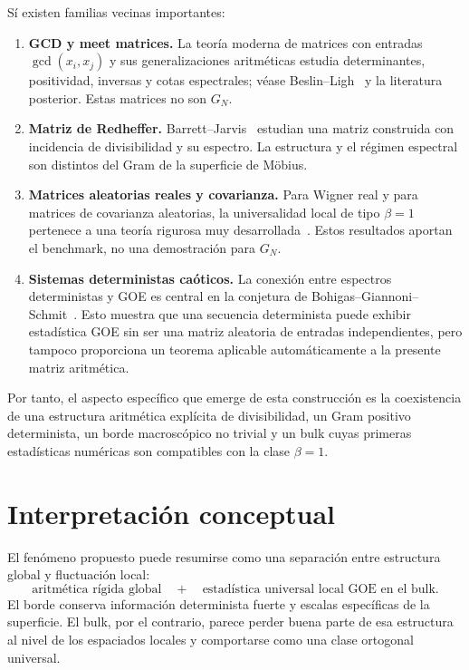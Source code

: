\documentclass[11pt,a4paper]{article}
\begin{document}
Sí existen familias vecinas importantes:

\begin{enumerate}
\item \textbf{GCD y meet matrices.} La teoría moderna de matrices con entradas $\gcd(x_i,x_j)$ y sus generalizaciones aritméticas estudia determinantes, positividad, inversas y cotas espectrales; véase Beslin--Ligh~\cite{BeslinLigh1989} y la literatura posterior. Estas matrices no son $G_N$.

\item \textbf{Matriz de Redheffer.} Barrett--Jarvis~\cite{BarrettJarvis1992} estudian una matriz construida con incidencia de divisibilidad y su espectro. La estructura y el régimen espectral son distintos del Gram de la superficie de Möbius.

\item \textbf{Matrices aleatorias reales y covarianza.} Para Wigner real y para matrices de covarianza aleatorias, la universalidad local de tipo $\beta=1$ pertenece a una teoría rigurosa muy desarrollada~\cite{ErdosYau2012,ErdosYauYin2012,TaoVuCov2012}. Estos resultados aportan el benchmark, no una demostración para $G_N$.

\item \textbf{Sistemas deterministas caóticos.} La conexión entre espectros deterministas y GOE es central en la conjetura de Bohigas--Giannoni--Schmit~\cite{BGS1984}. Esto muestra que una secuencia determinista puede exhibir estadística GOE sin ser una matriz aleatoria de entradas independientes, pero tampoco proporciona un teorema aplicable automáticamente a la presente matriz aritmética.
\end{enumerate}

Por tanto, el aspecto específico que emerge de esta construcción es la coexistencia de una estructura aritmética explícita de divisibilidad, un Gram positivo determinista, un borde macroscópico no trivial y un bulk cuyas primeras estadísticas numéricas son compatibles con la clase $\beta=1$.

\section{Interpretación conceptual}

El fenómeno propuesto puede resumirse como una separación entre estructura global y fluctuación local:
\begin{equation}
\boxed{
\text{aritmética rígida global}
\quad+\quad
\text{estadística universal local GOE en el bulk}.
}
\end{equation}
El borde conserva información determinista fuerte y escalas específicas de la superficie. El bulk, por el contrario, parece perder buena parte de esa estructura al nivel de los espaciados locales y comportarse como una clase ortogonal universal.
\end{document}
